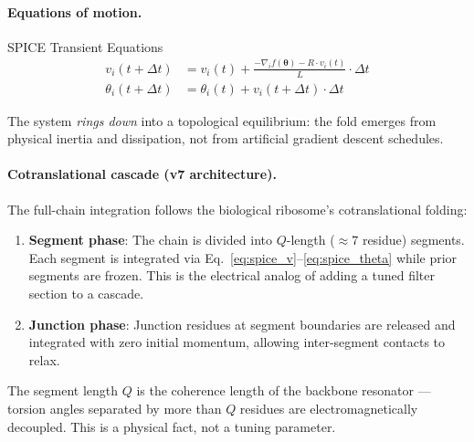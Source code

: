 \paragraph{Equations of motion.}
\begin{resultbox}{SPICE Transient Equations}
\begin{align}
    v_i(t + \Delta t) &= v_i(t) + \frac{-\nabla_i f(\boldsymbol{\theta}) - R \cdot v_i(t)}{L} \cdot \Delta t \label{eq:spice_v} \\
    \theta_i(t + \Delta t) &= \theta_i(t) + v_i(t + \Delta t) \cdot \Delta t \label{eq:spice_theta}
\end{align}
\end{resultbox}
\noindent The system \emph{rings down} into a topological equilibrium: the fold emerges from physical inertia and dissipation, not from artificial gradient descent schedules.

\paragraph{Cotranslational cascade (v7 architecture).}
The full-chain integration follows the biological ribosome's cotranslational folding:
\begin{enumerate}
    \item \textbf{Segment phase}: The chain is divided into $Q$-length ($\approx 7$ residue) segments.  Each segment is integrated via Eq.~\ref{eq:spice_v}--\ref{eq:spice_theta} while prior segments are frozen.  This is the electrical analog of adding a tuned filter section to a cascade.
    \item \textbf{Junction phase}: Junction residues at segment boundaries are released and integrated with zero initial momentum, allowing inter-segment contacts to relax.
\end{enumerate}
The segment length $Q$ is the coherence length of the backbone resonator --- torsion angles separated by more than $Q$ residues are electromagnetically decoupled.  This is a physical fact, not a tuning parameter.

